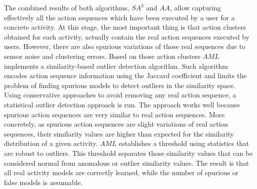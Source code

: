 The combined results of both algorithms, $SA^3$ and $AA$, allow capturing effectively all the action sequences which have been executed by a user for a concrete activity. At this stage, the most important thing is that action clusters obtained for each activity, actually contain the real action sequences executed by users. However, there are also spurious variations of those real sequences due to sensor noise and clustering errors. Based on those action clusters $AML$ implements a similarity-based outlier detection algorithm. Such algorithm encodes action sequence information using the Jaccard coefficient and limits the problem of finding spurious models to detect outliers in the similarity space. Using conservative approaches to avoid removing any real action sequence, a statistical outlier detection approach is run. The approach works well because spurious action sequences are very similar to real action sequences. More concretely, as spurious action sequences are slight variations of real action sequences, their similarity values are higher than expected for the similarity distribution of a given activity. $AML$ establishes a threshold using statistics that are robust to outliers. This threshold separates those similarity values that can be considered normal from anomalous or outlier similarity values. The result is that all real activity models are correctly learned, while the number of spurious or false models is assumable. 

